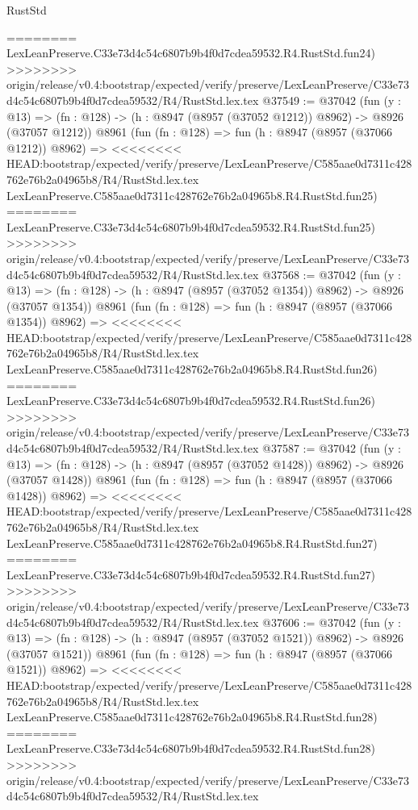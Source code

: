 \begin{lexlean}{RustStd}
\begin{coremodule}
{\begin{coremodule}
{{{{{{{{{{{{{{{{{{{{{{{{{{{{{{{{{{{{{{{========
    LexLeanPreserve.C33e73d4c54c6807b9b4f0d7cdea59532.R4.RustStd.fun24)
>>>>>>>> origin/release/v0.4:bootstrap/expected/verify/preserve/LexLeanPreserve/C33e73d4c54c6807b9b4f0d7cdea59532/R4/RustStd.lex.tex
@37549 := @37042
    (fun (y : @13) =>
    (fn : @128) -> (h : @8947 (@8957 (@37052 @1212)) @8962) -> @8926 (@37057 @1212))
    @8961
    (fun (fn : @128) =>
    fun (h : @8947 (@8957 (@37066 @1212)) @8962) =>
<<<<<<<< HEAD:bootstrap/expected/verify/preserve/LexLeanPreserve/C585aae0d7311c428762e76b2a04965b8/R4/RustStd.lex.tex
    LexLeanPreserve.C585aae0d7311c428762e76b2a04965b8.R4.RustStd.fun25)
========
    LexLeanPreserve.C33e73d4c54c6807b9b4f0d7cdea59532.R4.RustStd.fun25)
>>>>>>>> origin/release/v0.4:bootstrap/expected/verify/preserve/LexLeanPreserve/C33e73d4c54c6807b9b4f0d7cdea59532/R4/RustStd.lex.tex
@37568 := @37042
    (fun (y : @13) =>
    (fn : @128) -> (h : @8947 (@8957 (@37052 @1354)) @8962) -> @8926 (@37057 @1354))
    @8961
    (fun (fn : @128) =>
    fun (h : @8947 (@8957 (@37066 @1354)) @8962) =>
<<<<<<<< HEAD:bootstrap/expected/verify/preserve/LexLeanPreserve/C585aae0d7311c428762e76b2a04965b8/R4/RustStd.lex.tex
    LexLeanPreserve.C585aae0d7311c428762e76b2a04965b8.R4.RustStd.fun26)
========
    LexLeanPreserve.C33e73d4c54c6807b9b4f0d7cdea59532.R4.RustStd.fun26)
>>>>>>>> origin/release/v0.4:bootstrap/expected/verify/preserve/LexLeanPreserve/C33e73d4c54c6807b9b4f0d7cdea59532/R4/RustStd.lex.tex
@37587 := @37042
    (fun (y : @13) =>
    (fn : @128) -> (h : @8947 (@8957 (@37052 @1428)) @8962) -> @8926 (@37057 @1428))
    @8961
    (fun (fn : @128) =>
    fun (h : @8947 (@8957 (@37066 @1428)) @8962) =>
<<<<<<<< HEAD:bootstrap/expected/verify/preserve/LexLeanPreserve/C585aae0d7311c428762e76b2a04965b8/R4/RustStd.lex.tex
    LexLeanPreserve.C585aae0d7311c428762e76b2a04965b8.R4.RustStd.fun27)
========
    LexLeanPreserve.C33e73d4c54c6807b9b4f0d7cdea59532.R4.RustStd.fun27)
>>>>>>>> origin/release/v0.4:bootstrap/expected/verify/preserve/LexLeanPreserve/C33e73d4c54c6807b9b4f0d7cdea59532/R4/RustStd.lex.tex
@37606 := @37042
    (fun (y : @13) =>
    (fn : @128) -> (h : @8947 (@8957 (@37052 @1521)) @8962) -> @8926 (@37057 @1521))
    @8961
    (fun (fn : @128) =>
    fun (h : @8947 (@8957 (@37066 @1521)) @8962) =>
<<<<<<<< HEAD:bootstrap/expected/verify/preserve/LexLeanPreserve/C585aae0d7311c428762e76b2a04965b8/R4/RustStd.lex.tex
    LexLeanPreserve.C585aae0d7311c428762e76b2a04965b8.R4.RustStd.fun28)
========
    LexLeanPreserve.C33e73d4c54c6807b9b4f0d7cdea59532.R4.RustStd.fun28)
>>>>>>>> origin/release/v0.4:bootstrap/expected/verify/preserve/LexLeanPreserve/C33e73d4c54c6807b9b4f0d7cdea59532/R4/RustStd.lex.tex
}}}}}}}}}}}}}}}}}}}}}}}}}}}}}}}}}}}}}}}
\end{coremodule}}
\end{coremodule}
\end{lexlean}
